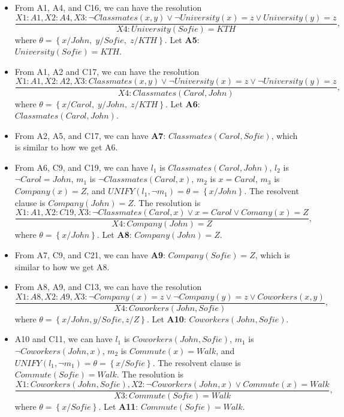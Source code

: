 \documentclass[11pt,a4paper]{article}
\begin{document}
\begin{itemize}
	\item From A1, A4, and C16, we can have the resolution
	$$
	\frac{X1: A1, X2: A4, X3: \lnot Classmates(x, y) \vee \lnot University(x) = z \vee University(y) = z}{X4: University(Sofie) = KTH},
	$$
	where $\theta = \left\{ x/John,\; y/Sofie,\; z/KTH \right\}$. Let \textbf{A5}: $University(Sofie) = KTH$.
	
	\item From A1, A2 and C17, we can have the resolution
	$$
	\frac{X1: A1, X2: A2, X3: Classmates(x, y) \vee \lnot University(x) = z \vee \lnot University(y) = z}{X4: Classmates(Carol, John)},
	$$
	where $\theta = \left\{ x/Carol,\; y/John,\; z/KTH \right\}$. Let \textbf{A6}: $Classmates(Carol, John)$.
	
	\item From A2, A5, and C17, we can have \textbf{A7}: $Classmates(Carol, Sofie)$, which is similar to how we get A6.
	
	\item From A6, C9, and C19, we can have $l_{1}$ is $Classmates(Carol, John)$, $l_{2}$ is $\lnot Carol = John$, $m_{1}$ is $\lnot Classmates(Carol, x)$, $m_{2}$ is $x = Carol$, $m_{3}$ is $Company(x) = Z$, and $UNIFY(l_{1}, \lnot m_{1}) = \theta = \left\{ x/John \right\}$. The resolvent clause is $Company(John) = Z$. The resolution is
	$$
	\frac{X1: A1, X2: C19, X3: \lnot Classmates(Carol, x) \vee x = Carol \vee Comany(x) = Z}{X4: Company(John) = Z},
	$$
	where $\theta = \left\{ x/John \right\}$. Let \textbf{A8}: $Company(John) = Z$.
	
	\item From A7, C9, and C21, we can have \textbf{A9}: $Company(Sofie) = Z$, which is similar to how we get A8.
	
	\item From A8, A9, and C13, we can have the resolution
	$$
	\frac{X1: A8, X2: A9, X3: \lnot Company(x) = z \vee \lnot Company(y) = z \vee Coworkers(x, y)}{X4: Coworkers(John, Sofie)},
	$$
	where $\theta = \left\{ x/John, y/Sofie, z/Z \right\}$. Let \textbf{A10}: $Coworkers(John, Sofie)$.
	
	\item A10 and C11, we can have $l_{1}$ is $Coworkers(John, Sofie)$, $m_{1}$ is $\lnot Coworkers(John, x)$, $m_{2}$ is $Commute(x) = Walk$, and $UNIFY(l_{1}, \lnot m_{1}) = \theta = \left\{ x/Sofie  \right\}$. The resolvent clause is $Commute(Sofie) = Walk$. The resolution is
	$$
	\frac{X1: Coworkers(John, Sofie), X2: \lnot Coworkers(John, x) \vee Commute(x) = Walk}{X3: Commute(Sofie) = Walk},
	$$
	where $\theta = \left\{ x/Sofie \right\}$. Let \textbf{A11}: $Commute(Sofie) = Walk$.
	

\end{itemize}
\end{document}
